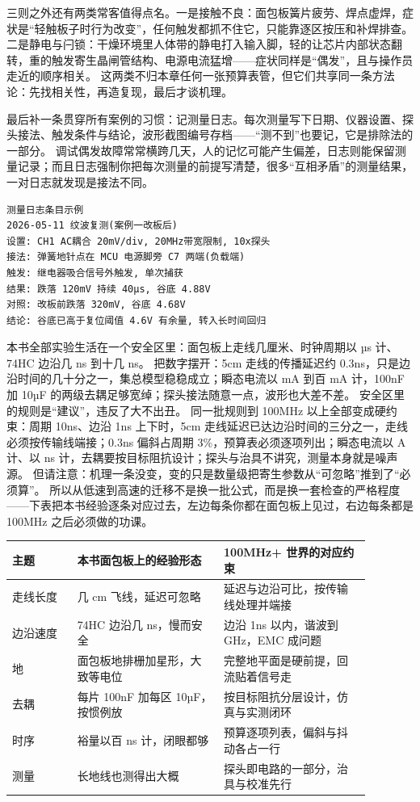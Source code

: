 三则之外还有两类常客值得点名。一是接触不良：面包板簧片疲劳、焊点虚焊，症状是“轻触板子时行为改变”，任何触发都抓不住它，只能靠逐区按压和补焊排查。
二是静电与闩锁：干燥环境里人体带的静电打入输入脚，轻的让芯片内部状态翻转，重的触发寄生晶闸管结构、电源电流猛增——症状同样是“偶发”，且与操作员走近的顺序相关。
这两类不归本章任何一张预算表管，但它们共享同一条方法论：先找相关性，再造复现，最后才谈机理。

最后补一条贯穿所有案例的习惯：记测量日志。每次测量写下日期、仪器设置、探头接法、触发条件与结论，波形截图编号存档——“测不到”也要记，它是排除法的一部分。
调试偶发故障常常横跨几天，人的记忆可能产生偏差，日志则能保留测量记录；而且日志强制你把每次测量的前提写清楚，很多“互相矛盾”的测量结果，一对日志就发现是接法不同。

\begin{lstlisting}
测量日志条目示例
2026-05-11 纹波复测(案例一改板后)
设置: CH1 AC耦合 20mV/div, 20MHz带宽限制, 10x探头
接法: 弹簧地针点在 MCU 电源脚旁 C7 两端(负载端)
触发: 继电器吸合信号外触发, 单次捕获
结果: 跌落 120mV 持续 40µs, 谷底 4.88V
对照: 改板前跌落 320mV, 谷底 4.68V
结论: 谷底已高于复位阈值 4.6V 有余量, 转入长时间回归
\end{lstlisting}

本书全部实验生活在一个安全区里：面包板上走线几厘米、时钟周期以 µs 计、74HC 边沿几 ns 到十几 ns。
把数字摆开：5cm 走线的传播延迟约 0.3ns，只是边沿时间的几十分之一，集总模型稳稳成立；瞬态电流以 mA 到百 mA 计，100nF 加 10µF 的两级去耦足够宽绰；探头接法随意一点，波形也大差不差。
安全区里的规则是“建议”，违反了大不出丑。
同一批规则到 100MHz 以上全部变成硬约束：周期 10ns、边沿 1ns 上下时，5cm 走线延迟已达边沿时间的三分之一，走线必须按传输线端接；0.3ns 偏斜占周期 3\%，预算表必须逐项列出；瞬态电流以 A 计、以 ns 计，去耦要按目标阻抗设计；探头与治具不讲究，测量本身就是噪声源。
但请注意：机理一条没变，变的只是数量级把寄生参数从“可忽略”推到了“必须算”。
所以从低速到高速的迁移不是换一批公式，而是换一套检查的严格程度——下表把本书经验逐条对应过去，左边每条你都在面包板上见过，右边每条都是 100MHz 之后必须做的功课。

\begin{longtable}{L{0.16\linewidth}L{0.36\linewidth}L{0.36\linewidth}}
\toprule
主题 & 本书面包板上的经验形态 & 100MHz+ 世界的对应约束 \\
\midrule
走线长度 & 几 cm 飞线，延迟可忽略 & 延迟与边沿可比，按传输线处理并端接 \\\tablerowrule
边沿速度 & 74HC 边沿几 ns，慢而安全 & 边沿 1ns 以内，谐波到 GHz，EMC 成问题 \\\tablerowrule
地 & 面包板地排栅加星形，大致等电位 & 完整地平面是硬前提，回流贴着信号走 \\\tablerowrule
去耦 & 每片 100nF 加每区 10µF，按惯例放 & 按目标阻抗分层设计，仿真与实测闭环 \\\tablerowrule
时序 & 裕量以百 ns 计，闭眼都够 & 预算逐项列表，偏斜与抖动各占一行 \\\tablerowrule
测量 & 长地线也测得出大概 & 探头即电路的一部分，治具与校准先行 \\
\bottomrule
\end{longtable}

